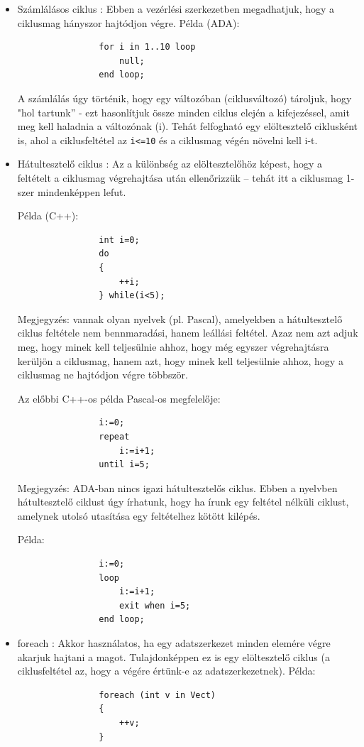 \documentclass[12pt,margin=0px]{article}
\begin{document}
\begin{itemize}
\begin{itemize}
			\item	Számlálásos ciklus : Ebben a vezérlési szerkezetben megadhatjuk, hogy a ciklusmag hányszor
			hajtódjon végre.
			Példa (ADA):
{\small
			\begin{verbatim}
				for i in 1..10 loop
				    null;
				end loop;
			\end{verbatim}
}
			A számlálás úgy történik, hogy egy változóban (ciklusváltozó) tároljuk, hogy "hol tartunk” - ezt hasonlítjuk
			össze minden ciklus elején a kifejezéssel, amit meg kell haladnia a változónak (i). Tehát
			felfogható egy elöltesztelő ciklusként is, ahol a ciklusfeltétel az \texttt{i<=10} és a ciklusmag végén
			növelni kell i-t.
			
			\item	Hátultesztelő ciklus : Az a különbség az elöltesztelőhöz képest, hogy a feltételt a ciklusmag
			végrehajtása után ellenőrizzük – tehát itt a ciklusmag 1-szer mindenképpen lefut.
			
			Példa (C++):
{\small			
			\begin{verbatim}
				int i=0;
				do
				{
				    ++i;
				} while(i<5);
			\end{verbatim}
}			
			\noindent Megjegyzés: vannak olyan nyelvek (pl. Pascal), amelyekben a hátultesztelő ciklus feltétele nem bennmaradási, hanem
			leállási feltétel. Azaz nem azt adjuk meg, hogy minek kell teljesülnie ahhoz, hogy még egyszer végrehajtásra kerüljön
			a ciklusmag, hanem azt, hogy minek kell teljesülnie ahhoz, hogy a ciklusmag ne hajtódjon végre többször.
			
			Az előbbi C++-os példa Pascal-os megfelelője:
{\small
			\begin{verbatim}
				i:=0;
				repeat
				    i:=i+1;
				until i=5;
			\end{verbatim}
}			
			\noindent Megjegyzés: ADA-ban nincs igazi hátultesztelős ciklus. Ebben a nyelvben hátultesztelő ciklust úgy írhatunk, hogy ha
			írunk egy feltétel nélküli ciklust, amelynek utolsó utasítása egy feltételhez kötött kilépés.
			
			Példa:
{\small
			\begin{verbatim}
				i:=0;
				loop
				    i:=i+1;
				    exit when i=5;
				end loop;
			\end{verbatim}
}			

			\item foreach : Akkor használatos, ha egy adatszerkezet minden elemére végre akarjuk hajtani a magot.
			Tulajdonképpen ez is egy elöltesztelő ciklus (a ciklusfeltétel az, hogy a végére értünk-e az
			adatszerkezetnek).
			Példa:
			\begin{verbatim}
				foreach (int v in Vect)
				{
				    ++v;
				}
			\end{verbatim}
			

\end{itemize}
\end{itemize}
\end{document}
